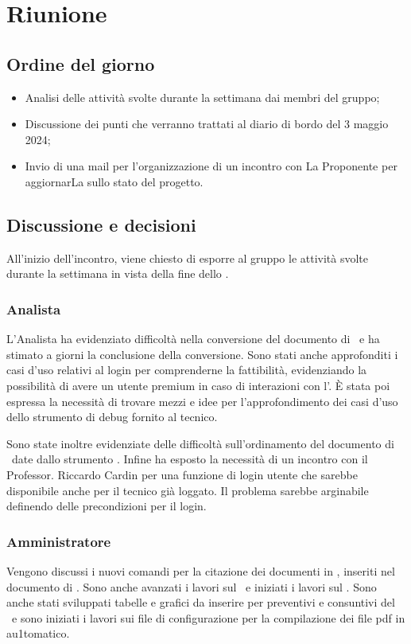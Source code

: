 \section{Riunione}
\subsection{Ordine del giorno}
\begin{itemize}
	\item Analisi delle attività svolte durante la settimana dai membri del gruppo;
	\item Discussione dei punti che verranno trattati al diario di bordo del 3 maggio 2024;
	\item Invio di una mail per l'organizzazione di un incontro con La Proponente per aggiornarLa sullo stato del progetto.
\end{itemize}

\subsection{Discussione e decisioni}
\par All'inizio dell'incontro, viene chiesto di esporre al gruppo le attività svolte durante la settimana in vista della fine dello .
\subsubsection{Analista}
\par L'Analista ha evidenziato difficoltà nella conversione del documento di \AdR\ e ha stimato a giorni la conclusione della conversione. Sono stati anche approfonditi i casi d'uso relativi al login per comprenderne la fattibilità, evidenziando la possibilità di avere un utente premium in caso di interazioni con l'. È stata poi espressa la necessità di trovare mezzi e idee per l'approfondimento dei casi d'uso dello strumento di debug fornito al tecnico.
\par Sono state inoltre evidenziate delle difficoltà sull'ordinamento del documento di \AdR\ date dallo strumento . Infine ha esposto la necessità di un incontro con il Professor. Riccardo Cardin per una funzione di login utente che sarebbe disponibile anche per il tecnico già loggato. Il problema sarebbe arginabile definendo delle precondizioni per il login. 
\subsubsection{Amministratore}
\par Vengono discussi i nuovi comandi per la citazione dei documenti in , inseriti nel documento di \NdP. Sono anche avanzati i lavori sul \PdP\ e iniziati i lavori sul \PdQ. Sono anche stati sviluppati tabelle e grafici da inserire per preventivi e consuntivi del \PdP\ e sono iniziati i lavori sui file di configurazione per la compilazione dei file pdf in au1tomatico.
